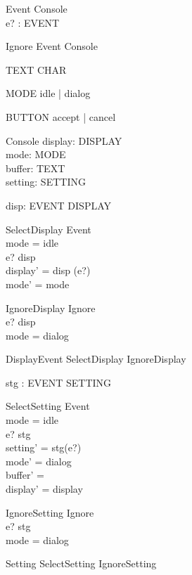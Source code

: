 \documentclass{llncs}
\begin{document}
\begin{zed}
[EVENT]
\end{zed}
\begin{schema}{Event}
\Delta Console\\
e? : EVENT
\end{schema}
\begin{zed}
Ignore \sdef Event \land \Xi Console
\end{zed}

\begin{zed}
\end{zed}
\begin{zed}
TEXT  \seq CHAR
\end{zed}
\begin{zed}
MODE \ddef idle | dialog
\end{zed}
\begin{zed}
BUTTON \ddef accept | cancel
\end{zed}
\begin{schema}{Console}
display: DISPLAY \\
mode: MODE \\
buffer: TEXT \\
setting: SETTING
\end{schema}

\begin{axdef}
disp: EVENT \pfun DISPLAY
\end{axdef}
\begin{schema}{SelectDisplay}
Event \\
\ST mode = idle \\
e? \in \dom disp \\
display' = disp (e?) \\
mode' = mode
\end{schema}
\begin{schema}{IgnoreDisplay}
Ignore \\
\ST e? \in \dom disp\\
mode = dialog
\end{schema}
\begin{zed}
DisplayEvent \sdef SelectDisplay \lor IgnoreDisplay
\end{zed}

\begin{axdef}
stg : EVENT \pfun SETTING
\end{axdef}
\begin{schema}{SelectSetting}
Event \\
\ST mode = idle \\
e? \in \dom stg \\
setting' = stg(e?) \\
mode' = dialog \\
buffer' = \emptyset \\
display' = display
\end{schema}
\begin{schema}{IgnoreSetting}
Ignore \\
\ST e? \in \dom stg \\
mode = dialog
\end{schema}
\begin{zed}
Setting \sdef SelectSetting \lor IgnoreSetting
\end{zed}
\end{document}
